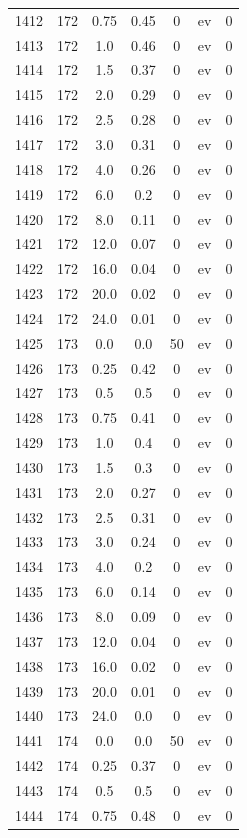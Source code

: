\documentclass[12pt,a4paper]{article}
\begin{document}
\begin{tabular}{r|cccccc}
	1412 & 172 & 0.75 & 0.45 & 0 & ev & 0 \\
	1413 & 172 & 1.0 & 0.46 & 0 & ev & 0 \\
	1414 & 172 & 1.5 & 0.37 & 0 & ev & 0 \\
	1415 & 172 & 2.0 & 0.29 & 0 & ev & 0 \\
	1416 & 172 & 2.5 & 0.28 & 0 & ev & 0 \\
	1417 & 172 & 3.0 & 0.31 & 0 & ev & 0 \\
	1418 & 172 & 4.0 & 0.26 & 0 & ev & 0 \\
	1419 & 172 & 6.0 & 0.2 & 0 & ev & 0 \\
	1420 & 172 & 8.0 & 0.11 & 0 & ev & 0 \\
	1421 & 172 & 12.0 & 0.07 & 0 & ev & 0 \\
	1422 & 172 & 16.0 & 0.04 & 0 & ev & 0 \\
	1423 & 172 & 20.0 & 0.02 & 0 & ev & 0 \\
	1424 & 172 & 24.0 & 0.01 & 0 & ev & 0 \\
	1425 & 173 & 0.0 & 0.0 & 50 & ev & 0 \\
	1426 & 173 & 0.25 & 0.42 & 0 & ev & 0 \\
	1427 & 173 & 0.5 & 0.5 & 0 & ev & 0 \\
	1428 & 173 & 0.75 & 0.41 & 0 & ev & 0 \\
	1429 & 173 & 1.0 & 0.4 & 0 & ev & 0 \\
	1430 & 173 & 1.5 & 0.3 & 0 & ev & 0 \\
	1431 & 173 & 2.0 & 0.27 & 0 & ev & 0 \\
	1432 & 173 & 2.5 & 0.31 & 0 & ev & 0 \\
	1433 & 173 & 3.0 & 0.24 & 0 & ev & 0 \\
	1434 & 173 & 4.0 & 0.2 & 0 & ev & 0 \\
	1435 & 173 & 6.0 & 0.14 & 0 & ev & 0 \\
	1436 & 173 & 8.0 & 0.09 & 0 & ev & 0 \\
	1437 & 173 & 12.0 & 0.04 & 0 & ev & 0 \\
	1438 & 173 & 16.0 & 0.02 & 0 & ev & 0 \\
	1439 & 173 & 20.0 & 0.01 & 0 & ev & 0 \\
	1440 & 173 & 24.0 & 0.0 & 0 & ev & 0 \\
	1441 & 174 & 0.0 & 0.0 & 50 & ev & 0 \\
	1442 & 174 & 0.25 & 0.37 & 0 & ev & 0 \\
	1443 & 174 & 0.5 & 0.5 & 0 & ev & 0 \\
	1444 & 174 & 0.75 & 0.48 & 0 & ev & 0 \\

\end{tabular}
\end{document}
